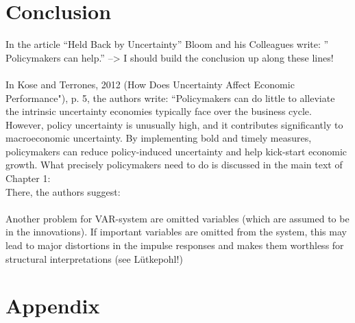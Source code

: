 \documentclass[a4paper,11pt,listof=nochaptergap,oneside,pointednumbers,bibtotoc,bigheadings,liststotoc]{scrbook}
\theoremstyle{mysatz}
\theoremstyle{mydefinition}
\theoremstyle{mybemerkung}
\begin{document}
\chapter{Conclusion}
\label{Conclusion}




In the article ``Held Back by Uncertainty'' Bloom and his Colleagues write: '' Policymakers can help.'' --> I should build the conclusion up along these lines! \\
\\
In Kose and Terrones, 2012 (How Does Uncertainty Affect Economic Performance"), p. 5, the authors write: ``Policymakers can do little to alleviate the intrinsic uncertainty economies typically face over the business cycle. However, policy uncertainty is unusually high, and it contributes significantly to macroeconomic uncertainty. By implementing bold and timely measures, policymakers can reduce policy-induced uncertainty and help kick-start economic growth. What precisely policymakers need to do is discussed in the main text of Chapter 1:\\
There, the authors suggest: 
\\
\\
Another problem for VAR-system are omitted variables (which are assumed to be in the innovations). If important variables are omitted from the system, this may lead to major distortions in the impulse responses and makes them worthless for structural interpretations (see Lütkepohl!)


\newpage
\appendix


\chapter{Appendix}
\label{VARAndLocalProjection}
\end{document}
